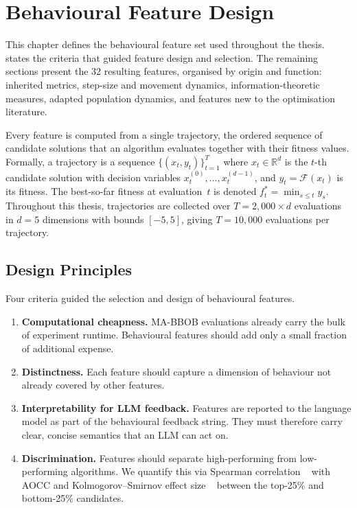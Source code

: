 
\chapter{Behavioural Feature Design}
\label{ch:features}

This chapter defines the behavioural feature set used throughout the thesis.  states the criteria that guided feature design and selection. The remaining sections present the 32 resulting features, organised by origin and function: inherited metrics, step-size and movement dynamics, information-theoretic measures, adapted population dynamics, and features new to the optimisation literature.

Every feature is computed from a single trajectory, the ordered sequence of candidate solutions that an algorithm evaluates together with their fitness values. Formally, a trajectory is a sequence $\{(x_t, y_t)\}_{t=1}^{T}$ where $x_t \in \mathbb{R}^d$ is the $t$-th candidate solution with decision variables $x_t^{(0)}, \ldots, x_t^{(d-1)}$, and $y_t = \mathcal{F}(x_t)$ is its fitness. The best-so-far fitness at evaluation~$t$ is denoted $f^*_t = \min_{s \le t} y_s$. Throughout this thesis, trajectories are collected over $T = 2{,}000 \times d$ evaluations in $d = 5$ dimensions with bounds $[-5, 5]$, giving $T = 10{,}000$ evaluations per trajectory.

\section{Design Principles}
\label{sec:features:principles}

Four criteria guided the selection and design of behavioural features.

\begin{enumerate}
  \item \textbf{Computational cheapness.} MA-BBOB evaluations already carry the bulk of experiment runtime. Behavioural features should add only a small fraction of additional expense.

  \item \textbf{Distinctness.} Each feature should capture a dimension of behaviour not already covered by other features.

  \item \textbf{Interpretability for LLM feedback.} Features are reported to the language model as part of the behavioural feedback string. They must therefore carry clear, concise semantics that an LLM can act on.

  \item \textbf{Discrimination.} Features should separate high-performing from low-performing algorithms. We quantify this via Spearman correlation ~\cite{spearman1904proof} with AOCC and Kolmogorov--Smirnov effect size ~\cite{kolmogorov1933} between the top-25\% and bottom-25\% candidates.
\end{enumerate}

